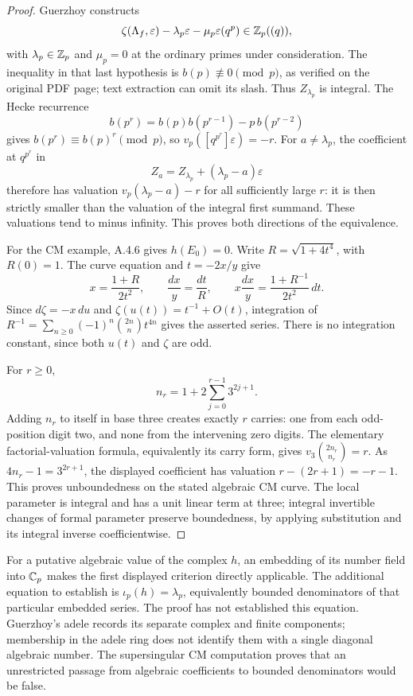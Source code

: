 \begin{proof}
Guerzhoy \cite[Theorem 2, pp.4--5, equation (4)]{EllGuerzhoy2014} constructs
\[
 \zeta(\Lambda_f,\varepsilon)-\lambda_p\varepsilon
 -\mu_p\varepsilon(q^p)\in\mathbb Z_p((q)),
\]
with $\lambda_p\in\mathbb Z_p$ and $\mu_p=0$ at the ordinary primes under consideration. The inequality in that last hypothesis is $b(p)\not\equiv0\pmod p$, as verified on the original PDF page; text extraction can omit its slash. Thus $Z_{\lambda_p}$ is integral. The Hecke recurrence
\[
 b(p^r)=b(p)b(p^{r-1})-p\,b(p^{r-2})
\]
gives $b(p^r)\equiv b(p)^r\pmod p$, so
$v_p([q^{p^r}]\varepsilon)=-r$. For $a\ne\lambda_p$, the coefficient at $q^{p^r}$ in
\[
 Z_a=Z_{\lambda_p}+(\lambda_p-a)\varepsilon
\]
therefore has valuation $v_p(\lambda_p-a)-r$ for all sufficiently large $r$: it is then strictly smaller than the valuation of the integral first summand. These valuations tend to minus infinity. This proves both directions of the equivalence.

For the CM example, A.4.6 gives $h(E_0)=0$. Write $R=\sqrt{1+4t^4}$, with $R(0)=1$. The curve equation and $t=-2x/y$ give
\[
 x=\frac{1+R}{2t^2},\qquad
 \frac{dx}{y}=\frac{dt}{R},\qquad
 x\frac{dx}{y}=\frac{1+R^{-1}}{2t^2}\,dt.
\]
Since $d\zeta=-x\,du$ and $\zeta(u(t))=t^{-1}+O(t)$, integration of
$R^{-1}=\sum_{n\ge0}(-1)^n\binom{2n}{n}t^{4n}$ gives the asserted series. There is no integration constant, since both $u(t)$ and $\zeta$ are odd.

For $r\ge0$,
\[
 n_r=1+2\sum_{j=0}^{r-1}3^{2j+1}.
\]
Adding $n_r$ to itself in base three creates exactly $r$ carries: one from each odd-position digit two, and none from the intervening zero digits. The elementary factorial-valuation formula, equivalently its carry form, gives
$v_3\binom{2n_r}{n_r}=r$. As $4n_r-1=3^{2r+1}$, the displayed coefficient has valuation
$r-(2r+1)=-r-1$. This proves unboundedness on the stated algebraic CM curve. The local parameter is integral and has a unit linear term at three; integral invertible changes of formal parameter preserve boundedness, by applying substitution and its integral inverse coefficientwise.
\end{proof}

For a putative algebraic value of the complex $h$, an embedding of its number field into $\mathbb C_p$ makes the first displayed criterion directly applicable. The additional equation to establish is $\iota_p(h)=\lambda_p$, equivalently bounded denominators of that particular embedded series. The proof has not established this equation. Guerzhoy's adele records its separate complex and finite components; membership in the adele ring does not identify them with a single diagonal algebraic number. The supersingular CM computation proves that an unrestricted passage from algebraic coefficients to bounded denominators would be false.

